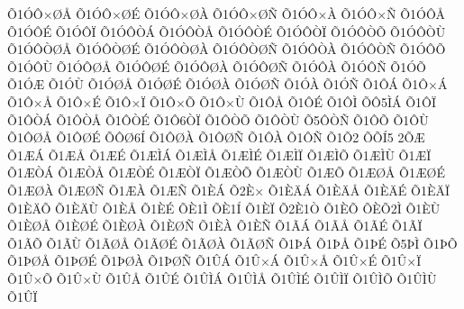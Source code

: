 {^^d51^^d3^^d4^^d7^^d8^^c5
^^d51^^d3^^d4^^d7^^d8^^c9
^^d51^^d3^^d4^^d7^^d8^^c0
^^d51^^d3^^d4^^d7^^d8^^d1
^^d51^^d3^^d4^^d7^^c0
^^d51^^d3^^d4^^d7^^d1
^^d51^^d3^^d4^^c5
^^d51^^d3^^d4^^c9
^^d51^^d3^^d4^^cf
^^d51^^d3^^d4^^d2^^c1
^^d51^^d3^^d4^^d2^^c5
^^d51^^d3^^d4^^d2^^c9
^^d51^^d3^^d4^^d2^^cf
^^d51^^d3^^d4^^d2^^d5
^^d51^^d3^^d4^^d2^^d9
^^d51^^d3^^d4^^d2^^d8^^c5
^^d51^^d3^^d4^^d2^^d8^^c9
^^d51^^d3^^d4^^d2^^d8^^c0
^^d51^^d3^^d4^^d2^^d8^^d1
^^d51^^d3^^d4^^d2^^c0
^^d51^^d3^^d4^^d2^^d1
^^d51^^d3^^d4^^d5
^^d51^^d3^^d4^^d9
^^d51^^d3^^d4^^d8^^c5
^^d51^^d3^^d4^^d8^^c9
^^d51^^d3^^d4^^d8^^c0
^^d51^^d3^^d4^^d8^^d1
^^d51^^d3^^d4^^c0
^^d51^^d3^^d4^^d1
^^d51^^d3^^d5
^^d51^^d3^^c6
^^d51^^d3^^d9
^^d51^^d3^^d8^^c5
^^d51^^d3^^d8^^c9
^^d51^^d3^^d8^^c0
^^d51^^d3^^d8^^d1
^^d51^^d3^^c0
^^d51^^d3^^d1
^^d51^^d4^^c1
^^d51^^d4^^d7^^c1
^^d51^^d4^^d7^^c5
^^d51^^d4^^d7^^c9
^^d51^^d4^^d7^^cf
^^d51^^d4^^d7^^d5
^^d51^^d4^^d7^^d9
^^d51^^d4^^c5
^^d51^^d4^^c9
^^d51^^d4^^cc
^^d5^^d45^^cc^^c1
^^d51^^d4^^cf
^^d51^^d4^^d2^^c1
^^d51^^d4^^d2^^c5
^^d51^^d4^^d2^^c9
^^d51^^d46^^d2^^cf
^^d51^^d4^^d2^^d5
^^d51^^d4^^d2^^d9
^^d55^^d4^^d2^^d1
^^d51^^d4^^d5
^^d51^^d4^^d9
^^d51^^d4^^d8^^c5
^^d51^^d4^^d8^^c9
^^d5^^d4^^d86^^cd
^^d51^^d4^^d8^^c0
^^d51^^d4^^d8^^d1
^^d51^^d4^^c0
^^d51^^d4^^d1
^^d51^^d52
^^d5^^d5^^cd5
2^^d5^^c6
^^d51^^c6^^c1
^^d51^^c6^^c5
^^d51^^c6^^c9
^^d51^^c6^^cc^^c1
^^d51^^c6^^cc^^c5
^^d51^^c6^^cc^^c9
^^d51^^c6^^cc^^cf
^^d51^^c6^^cc^^d5
^^d51^^c6^^cc^^d9
^^d51^^c6^^cf
^^d51^^c6^^d2^^c1
^^d51^^c6^^d2^^c5
^^d51^^c6^^d2^^c9
^^d51^^c6^^d2^^cf
^^d51^^c6^^d2^^d5
^^d51^^c6^^d2^^d9
^^d51^^c6^^d5
^^d51^^c6^^d8^^c5
^^d51^^c6^^d8^^c9
^^d51^^c6^^d8^^c0
^^d51^^c6^^d8^^d1
^^d51^^c6^^c0
^^d51^^c6^^d1
^^d51^^c8^^c1
^^d52^^c8^^d7
^^d51^^c8^^c4^^c1
^^d51^^c8^^c4^^c5
^^d51^^c8^^c4^^c9
^^d51^^c8^^c4^^cf
^^d51^^c8^^c4^^d5
^^d51^^c8^^c4^^d9
^^d51^^c8^^c5
^^d51^^c8^^c9
^^d5^^c81^^cc
^^d5^^c81^^cd
^^d51^^c8^^cf
^^d52^^c81^^d2
^^d51^^c8^^d5
^^d5^^c8^^d52^^cc
^^d51^^c8^^d9
^^d51^^c8^^d8^^c5
^^d51^^c8^^d8^^c9
^^d51^^c8^^d8^^c0
^^d51^^c8^^d8^^d1
^^d51^^c8^^c0
^^d51^^c8^^d1
^^d51^^c3^^c1
^^d51^^c3^^c5
^^d51^^c3^^c9
^^d51^^c3^^cf
^^d51^^c3^^d5
^^d51^^c3^^d9
^^d51^^c3^^d8^^c5
^^d51^^c3^^d8^^c9
^^d51^^c3^^d8^^c0
^^d51^^c3^^d8^^d1
^^d51^^de^^c1
^^d51^^de^^c5
^^d51^^de^^c9
^^d55^^de^^cc
^^d51^^de^^d5
^^d51^^de^^d8^^c5
^^d51^^de^^d8^^c9
^^d51^^de^^d8^^c0
^^d51^^de^^d8^^d1
^^d51^^db^^c1
^^d51^^db^^d7^^c1
^^d51^^db^^d7^^c5
^^d51^^db^^d7^^c9
^^d51^^db^^d7^^cf
^^d51^^db^^d7^^d5
^^d51^^db^^d7^^d9
^^d51^^db^^c5
^^d51^^db^^c9
^^d51^^db^^cc^^c1
^^d51^^db^^cc^^c5
^^d51^^db^^cc^^c9
^^d51^^db^^cc^^cf
^^d51^^db^^cc^^d5
^^d51^^db^^cc^^d9
^^d51^^db^^cf
}
